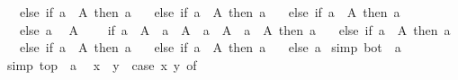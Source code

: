 \begin{isabellebody}
\ \ \ else\ if\ a\ {\isasymin}\ A\ then\ a\isanewline
\ \ \ else\ if\ a\ {\isasymin}\ A\ then\ a\isanewline
\ \ \ else\ if\ a\ {\isasymin}\ A\ then\ a\isanewline
\ \ \ else\ a\isanewline
{}\isamarkupfalse%
\isanewline
\ \ {\isachardoublequoteopen}{\isasymSqunion}A\ {\isacharequal}{\kern0pt}\ \isanewline
\ \ {\isacharparenleft}{\kern0pt}if\ a\ {\isasymin}\ A\ {\isasymor}\ a\ {\isasymin}\ A\ {\isasymand}\ {\isacharparenleft}{\kern0pt}a\ {\isasymin}\ A\ {\isasymor}\ a\ {\isasymin}\ A{\isacharparenright}{\kern0pt}\ then\ a\isanewline
\ \ \ else\ if\ a\ {\isasymin}\ A\ then\ a\isanewline
\ \ \ else\ if\ a\ {\isasymin}\ A\ then\ a\isanewline
\ \ \ else\ if\ a\ {\isasymin}\ A\ then\ a\isanewline
\ \ \ else\ a\isanewline
{}\isamarkupfalse%
\ {\isacharbrackleft}{\kern0pt}simp{\isacharbrackright}{\kern0pt}{\isacharcolon}{\kern0pt}\ {\isachardoublequoteopen}bot\ {\isacharequal}{\kern0pt}\ a\isanewline
{}\isamarkupfalse%
\ {\isacharbrackleft}{\kern0pt}simp{\isacharbrackright}{\kern0pt}{\isacharcolon}{\kern0pt}\ {\isachardoublequoteopen}top\ {\isacharequal}{\kern0pt}\ a\isanewline
{}\isamarkupfalse%
\isanewline
\ \ {\isachardoublequoteopen}x\ {\isasymsqinter}\ y\ {\isacharequal}{\kern0pt}\ {\isacharparenleft}{\kern0pt}case\ {\isacharparenleft}{\kern0pt}x{\isacharcomma}{\kern0pt}\ y{\isacharparenright}{\kern0pt}\ of\isanewline

\end{isabellebody}
